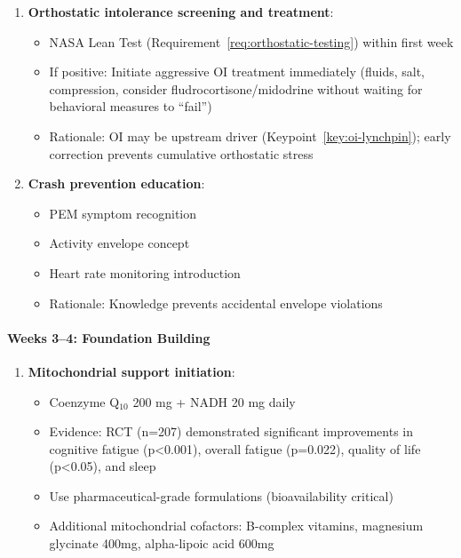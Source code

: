 \begin{protocol}
\begin{enumerate}
    \item \textbf{Orthostatic intolerance screening and treatment}:
    \begin{itemize}
        \item NASA Lean Test (Requirement~\ref{req:orthostatic-testing}) within first week
        \item If positive: Initiate aggressive OI treatment immediately (fluids, salt, compression, consider fludrocortisone/midodrine without waiting for behavioral measures to ``fail'')
        \item Rationale: OI may be upstream driver (Keypoint~\ref{key:oi-lynchpin}); early correction prevents cumulative orthostatic stress
    \end{itemize}

    \item \textbf{Crash prevention education}:
    \begin{itemize}
        \item PEM symptom recognition
        \item Activity envelope concept
        \item Heart rate monitoring introduction
        \item Rationale: Knowledge prevents accidental envelope violations
    \end{itemize}
\end{enumerate}

\paragraph{Weeks 3--4: Foundation Building}

\begin{enumerate}
    \item \textbf{Mitochondrial support initiation}:
    \begin{itemize}
        \item Coenzyme Q$_{10}$ 200 mg + NADH 20 mg daily
        \item Evidence: RCT (n=207) demonstrated significant improvements in cognitive fatigue (p<0.001), overall fatigue (p=0.022), quality of life (p<0.05), and sleep~\cite{CastroMarrero2021fatigue}
        \item Use pharmaceutical-grade formulations (bioavailability critical)~\cite{DiPierro2024CoQ10}
        \item Additional mitochondrial cofactors: B-complex vitamins, magnesium glycinate 400mg, alpha-lipoic acid 600mg
    \end{itemize}


\end{enumerate}
\end{protocol}
